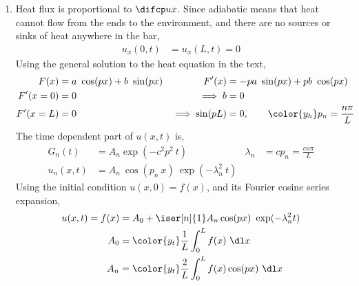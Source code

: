 \begin{enumerate}
    \item Heat flux is proportional to $ \difcp ux $. Since adiabatic means that
          heat cannot flow from the ends to the environment, and there are no sources
          or sinks of heat anywhere in the bar,
          \begin{align}
              u_x(0, t) & = u_x(L, t) = 0
          \end{align}
          Using the general solution to the heat equation in the text,
          \begin{align}
              F(x)              & = a\ \cos(px) + b\ \sin(px)                  &
              F'(x)             & = -pa\ \sin(px) + pb\ \cos(px)                 \\
              F'(x = 0)         & = 0                                          &
              \implies b        & = 0                                            \\
              F'(x = L)         & = 0                                          &
              \implies \sin(pL) & = 0, \qquad \color{y_h} p_n = \frac{n\pi}{L}   \\
          \end{align}
          The time dependent part of $ u(x, t) $ is,
          \begin{align}
              G_n(t)    & = A_n \exp(-c^2p^2\ t)                     &
              \lambda_n & = cp_n = \frac{cn\pi}{L}                     \\
              u_n(x, t) & = A_n\ \cos(p_n\ x)\ \exp(-\lambda_n^2\ t)
          \end{align}
          Using the initial condition $ u(x, 0) = f(x)$, and its Fourier cosine series
          expansion,
          \begin{align}
              u(x, t) = f(x) & = A_0 + \iser[n]{1} A_n \cos(px)\ \exp(-\lambda_n^2 t) \\
              A_0            & = \color{y_t} \frac{1}{L} \int_{0}^{L} f(x)\ \dl x     \\
              A_n            & = \color{y_t} \frac{2}{L} \int_{0}^{L} f(x) \cos(px)
              \ \dl x
          \end{align}


\end{enumerate}
